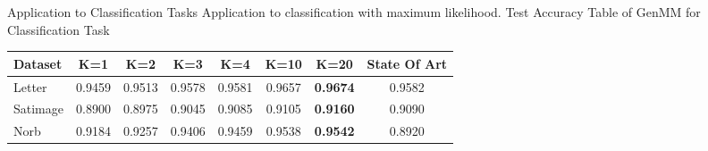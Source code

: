 \begin{frame}{Application to Classification Tasks}
  Application to classification with maximum likelihood. Test Accuracy Table of GenMM for Classification Task
  \begin{table}
    \centering
    \begin{tabular}{lccccccc} \toprule
      {Dataset} &  K=1 &  K=2 &  K=3 &  K=4 & K=10 & K=20 & State Of Art \\ \midrule
      Letter & 0.9459 &  0.9513 & 0.9578  & 0.9581 & 0.9657 & \textbf{0.9674} & {0.9582}  \\ \midrule
      Satimage & 0.8900 & 0.8975 & 0.9045 & 0.9085 & 0.9105 & \textbf{0.9160} & 0.9090    \\ \midrule
      Norb & 0.9184 & 0.9257 & 0.9406 & 0.9459 & 0.9538 & \textbf{0.9542} & 0.8920   \\
      \bottomrule
    \end{tabular}

  \end{table}
\end{frame}

